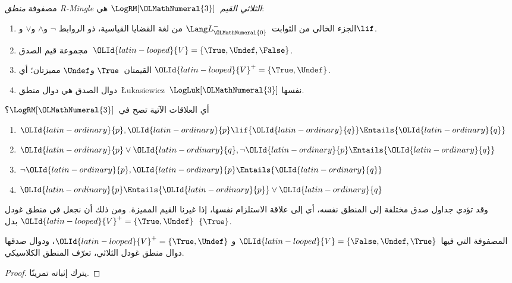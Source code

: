 \documentclass[../../../include/open-logic-section]{subfiles}
\begin{document}
\begin{defn}
  مصفوفة \emph{منطق R-Mingle الثلاثي القيم}~$\LogRM[{\OLMathNumeral{3}}]$ هي:
  \begin{enumerate}
    \item الجزء الخالي من الثوابت~$\Lang L_{\OLMathNumeral{0}}^{-}$ من لغة القضايا القياسية، ذو الروابط
    $\lnot$ و$\land$ و$\lor$ و$\lif$.
    \item مجموعة قيم الصدق~${\OLId{latin-looped}{V}} = \{\True, \Undef, \False\}$.
    \item القيمتان~$\True$ و$\Undef$ مميزتان؛ أي
    ${\OLId{latin-looped}{V}}^+ = \{\True, \Undef\}$.
    \item دوال الصدق هي دوال منطق~\L ukasiewicz~$\LogLuk[{\OLMathNumeral{3}}]$ نفسها.
  \end{enumerate}
\end{defn}

\begin{prob}
  أي العلاقات الآتية تصح في~$\LogRM[{\OLMathNumeral{3}}]$؟
  \begin{enumerate}
    \item ${\OLId{latin-ordinary}{p}}, {\OLId{latin-ordinary}{p}} \lif {\OLId{latin-ordinary}{q}} \Entails {\OLId{latin-ordinary}{q}}$
    \item ${\OLId{latin-ordinary}{p}} \lor {\OLId{latin-ordinary}{q}}, \lnot {\OLId{latin-ordinary}{p}} \Entails {\OLId{latin-ordinary}{q}}$
    \item $\lnot {\OLId{latin-ordinary}{p}}, {\OLId{latin-ordinary}{p}} \Entails {\OLId{latin-ordinary}{q}}$
    \item ${\OLId{latin-ordinary}{p}} \Entails {\OLId{latin-ordinary}{p}} \lor {\OLId{latin-ordinary}{q}}$
  \end{enumerate}
\end{prob}

وقد تؤدي جداول صدق مختلفة إلى المنطق نفسه، أي إلى علاقة الاستلزام
نفسها، إذا غيرنا القيم المميزة. ومن ذلك أن نجعل في منطق غودل
${\OLId{latin-looped}{V}}^+ = \{\True, \Undef\}$ بدل~$\{\True\}$.

\begin{prop}
  المصفوفة التي فيها~${\OLId{latin-looped}{V}} = \{\False, \Undef,\True\}$ و
  ${\OLId{latin-looped}{V}}^+=\{\True, \Undef\}$، ودوال صدقها دوال منطق غودل الثلاثي،
  تعرّف المنطق الكلاسيكي.
\end{prop}

\begin{proof}
  يترك إثباته تمرينًا.
\end{proof}
\end{document}
